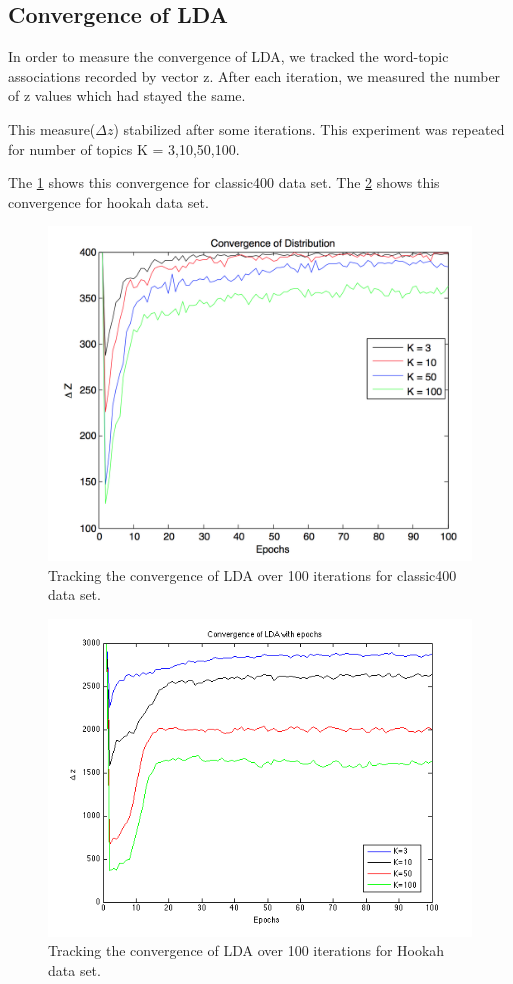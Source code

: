 \documentclass[11pt,a4paper,oneside]{article}
\begin{document}
\subsection{Convergence of LDA}
In order to measure the convergence of LDA, we tracked the word-topic associations recorded by vector z. After each iteration, we measured the number of z values which had stayed the same. 

This measure($\Delta z$) stabilized after some iterations. This experiment was repeated for number of topics K = 3,10,50,100. 

The \ref{fig:classic400_convergence} shows this convergence for classic400 data set. The \ref{fig:hookah_convergence} shows this convergence for hookah data set.

\begin{figure}[H]
\centering
\includegraphics[width=\columnwidth]{classic400_convergence}
\caption{Tracking the convergence of LDA over 100 iterations for classic400 data set.}
\label{fig:classic400_convergence}
\end{figure}

\begin{figure}[H]
\centering
\includegraphics[width=\columnwidth]{hookah_convergence}
\caption{Tracking the convergence of LDA over 100 iterations for Hookah data set.}
\label{fig:hookah_convergence}
\end{figure}
\end{document}
